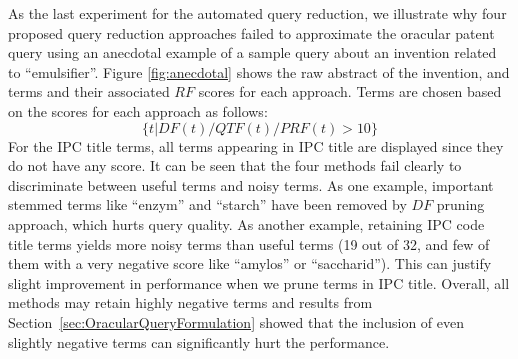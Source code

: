 As the last experiment for the automated query reduction, we illustrate why four proposed query reduction approaches failed to approximate the oracular patent query using an anecdotal example of a sample query about an invention related to ``emulsifier''. 
Figure \ref{fig:anecdotal} shows the raw abstract of the invention, and terms and their associated $\mathit{RF}$ scores for each approach. 
Terms are chosen based on the scores for each approach as follows: 
\begin{displaymath}\{t| DF(t)/QTF(t)/PRF(t)>10\}\end{displaymath}
For the IPC title terms, all terms appearing in IPC title are displayed since they do not have any score.   
It can be seen that the four methods fail clearly to discriminate between useful terms and noisy terms. As one example, important stemmed terms like ``enzym'' and ``starch'' have been removed by $\mathit{DF}$ pruning approach, which hurts query quality.  As another example, retaining IPC code title terms yields more noisy terms than useful terms (19 out of 32, and few of them with a very negative score like ``amylos'' or ``saccharid''). This can justify slight improvement in performance when we prune terms in IPC title. Overall, all methods may retain highly negative terms and results from Section~\ref{sec:OracularQueryFormulation} showed that the inclusion of even slightly negative terms can significantly hurt the performance.
